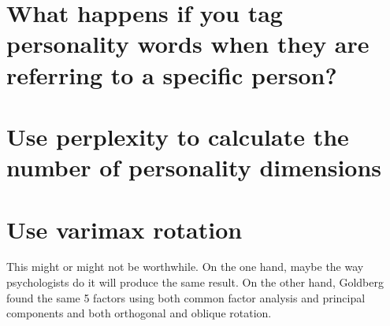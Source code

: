\documentclass[eric_thesis.tex]{subfiles}
\begin{document}
\section{What happens if you tag personality words when they are referring to a specific person?}

\section{Use perplexity to calculate the number of personality dimensions}

\section{Use varimax rotation}


This might or might not be worthwhile. On the one hand, maybe the way
psychologists do it will produce the same result. On the other hand,
Goldberg  found the same 5 factors using both common factor
analysis and principal components and both orthogonal and oblique
rotation.
\end{document}
